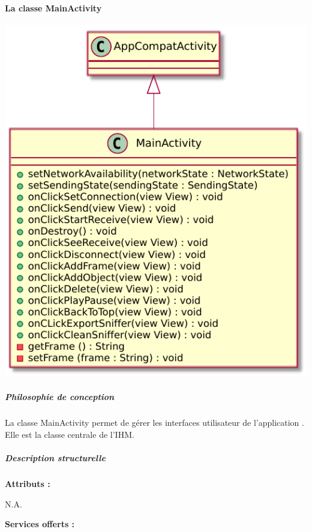 \paragraph{La classe MainActivity}

\begin{minipage}
    {\linewidth}
    \centering
    \includegraphics[width=0.60\linewidth]{../schemas/Conception_detaillee/classe_mainActivity.pdf}
\end{minipage}

\subparagraph{Philosophie de conception \newline} 

\medspace

La classe MainActivity permet de gérer les interfaces utilisateur de l'application {\nomApplication}. Elle est la classe centrale de l'IHM. 

\subparagraph{Description structurelle \newline}

\medspace

\textbf{Attributs :}

N.A.

\textbf{Services offerts :}

